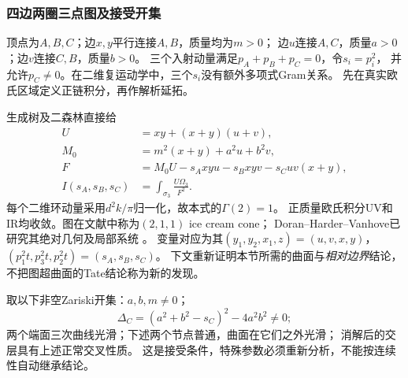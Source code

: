 \documentclass[11pt,a4paper,oneside]{ctexart}
\theoremstyle{cnplain}
\theoremstyle{definition}
\theoremstyle{remark}
\numberwithin{equation}{section}
\begin{document}
\subsubsection{四边两圈三点图及接受开集}
顶点为$A,B,C$；边$x,y$平行连接$A,B$，质量均为$m>0$；
边$u$连接$A,C$，质量$a>0$；边$v$连接$C,B$，质量$b>0$。
三个入射动量满足$p_A+p_B+p_C=0$，令$s_i=p_i^2$，
并允许$p_C\ne0$。在二维复运动学中，三个$s_i$没有额外多项式Gram关系。
先在真实欧氏区域定义正链积分，再作解析延拓。

生成树及二森林直接给
\begin{align}
 U&=xy+(x+y)(u+v),\\
 M_0&=m^2(x+y)+a^2u+b^2v,\\
 F&=M_0U-s_Axyu-s_Bxyv-s_Cuv(x+y),\\
 I(s_A,s_B,s_C)&=\int_{\sigma_3}\frac{U\Omega_3}{F^2}.
 \label{unified:eq:injectedgraph}
\end{align}
每个二维环动量采用$d^2k/\pi$归一化，故本式的$\Gamma(2)=1$。
正质量欧氏积分UV和IR均收敛。图在文献中称为$(2,1,1)$ ice cream cone；
Doran--Harder--Vanhove已研究其绝对几何及局部系统
\cite[\S7.3, 式(120)--(121), Proposition7.6]{dhv2023}。
变量对应为其$(y_1,y_2,x_1,z)=(u,v,x,y)$，
$(p_1^2t,p_3^2t,p_2^2t)=(s_A,s_B,s_C)$。
下文重新证明本节所需的曲面与\emph{相对边界}结论，
不把图超曲面的Tate结论称为新的发现。

取以下非空Zariski开集：$a,b,m\ne0$；
\begin{equation}\label{unified:eq:injecteddiscriminant}
 \Delta_C=(a^2+b^2-s_C)^2-4a^2b^2\ne0;
\end{equation}
两个端面三次曲线光滑；下述两个节点普通，曲面在它们之外光滑；
消解后的交层具有上述正常交叉性质。
这是接受条件，特殊参数必须重新分析，不能按连续性自动继承结论。
\end{document}
